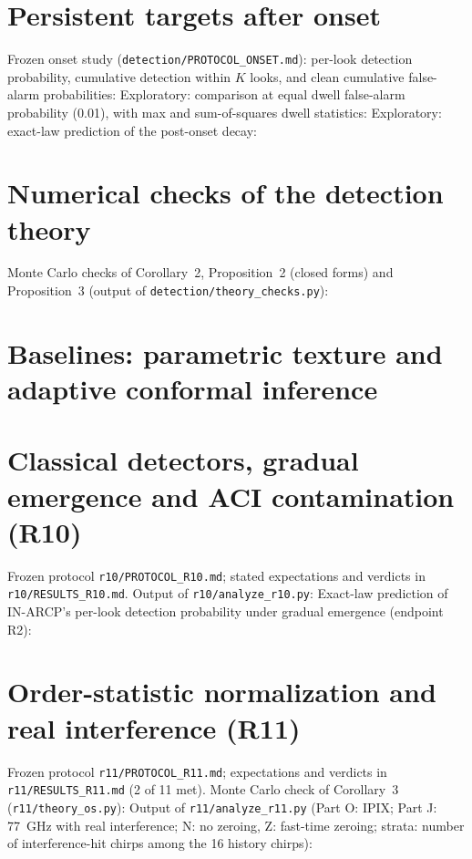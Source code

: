 \documentclass[10pt]{article}
\begin{document}
\section{Persistent targets after onset}
Frozen onset study (\texttt{detection/PROTOCOL\_ONSET.md}): per-look detection probability, cumulative detection within $K$ looks, and clean cumulative false-alarm probabilities:
\noindent Exploratory: comparison at equal dwell false-alarm probability (0.01), with max and sum-of-squares dwell statistics:
\noindent Exploratory: exact-law prediction of the post-onset decay:

\section{Numerical checks of the detection theory}
Monte Carlo checks of Corollary~2, Proposition~2 (closed forms) and Proposition~3 (output of \texttt{detection/theory\_checks.py}):

\section{Baselines: parametric texture and adaptive conformal inference}


\section{Classical detectors, gradual emergence and ACI contamination (R10)}
Frozen protocol \texttt{r10/PROTOCOL\_R10.md}; stated expectations and verdicts in \texttt{r10/RESULTS\_R10.md}. Output of \texttt{r10/analyze\_r10.py}:
\noindent Exact-law prediction of IN-ARCP's per-look detection probability under gradual emergence (endpoint R2):


\section{Order-statistic normalization and real interference (R11)}
Frozen protocol \texttt{r11/PROTOCOL\_R11.md}; expectations and verdicts in \texttt{r11/RESULTS\_R11.md} (2 of 11 met). Monte Carlo check of Corollary~3 (\texttt{r11/theory\_os.py}):
\noindent Output of \texttt{r11/analyze\_r11.py} (Part O: IPIX; Part J: 77~GHz with real interference; N: no zeroing, Z: fast-time zeroing; strata: number of interference-hit chirps among the 16 history chirps):
\end{document}
